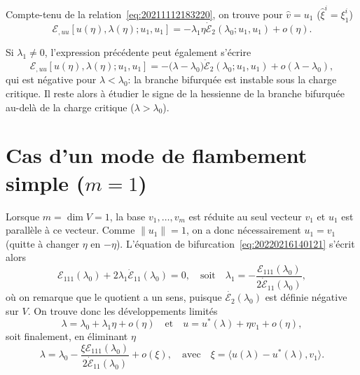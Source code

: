 \documentclass[12pt, final]{amsart}
\begin{document}
Compte-tenu de la relation~\eqref{eq:20211112183220}, on trouve pour
\(\hat{v}=u_1\) (\(\hat{\xi }^i=\xi _1^i\))
\begin{equation}
  \mathcal E_{,uu}[u(\eta ), \lambda (\eta ); u_1, u_1]=-\lambda _1\eta \dot{\mathcal E}_2(\lambda _0; u_1, u_1)+o(\eta ).
\end{equation}

Si \(\lambda _1\neq0\), l'expression précédente peut également s'écrire
\begin{equation}
  \mathcal E_{,uu}[u(\eta ), \lambda (\eta ); u_1, u_1]=-\bigl(\lambda -\lambda _0\bigr)\dot{\mathcal E}_2(\lambda _0; u_1, u_1)+o(\lambda -\lambda _0),
\end{equation}
qui est négative pour \(\lambda <\lambda _0\): la branche bifurquée est instable sous la
charge critique. Il reste alors à étudier le signe de la hessienne de la
branche bifurquée au-delà de la charge critique (\(\lambda >\lambda _0\)).

\section{Cas d'un mode de flambement simple (\(m=1\))}

Lorsque \(m=\dim V=1\), la base \(v_1, \ldots, v_m\) est réduite au seul vecteur
\(v_1\) et \(u_1\) est parallèle à ce vecteur. Comme \(\lVert u_1\rVert=1\), on a
donc nécessairement \(u_1=v_1\) (quitte à changer \(\eta \) en \(-\eta \)). L'équation de
bifurcation~\eqref{eq:20220216140121} s'écrit alors
\begin{equation}
  \label{eq:20220203144712}
  \mathcal E_{111}(\lambda _0)+2\lambda _1\dot{\mathcal E}_{11}(\lambda _0)=0,
  \quad\text{soit}\quad
  \lambda _1=-\frac{\mathcal E_{111}(\lambda _0)}{2\dot{\mathcal E}_{11}(\lambda _0)},
\end{equation}
où on remarque que le quotient a un sens, puisque \(\dot{\mathcal E_2}(\lambda _0)\) est définie
négative sur \(V\). On trouve donc les développements limités
\begin{equation}
  \lambda =\lambda _0+\lambda _1\eta +o(\eta )
  \quad\text{et}\quad
  u=u^*(\lambda )+\eta v_1+o(\eta ),
\end{equation}
soit finalement, en éliminant \(\eta \)
\begin{equation}
  \lambda =\lambda _0-\frac{\xi \mathcal E_{111}(\lambda _0)}{2\dot{\mathcal E}_{11}(\lambda _0)}+o(\xi ),
  \quad\text{avec}\quad
  \xi =\langle u(\lambda )-u^*(\lambda ), v_1\rangle .
\end{equation}
\end{document}
